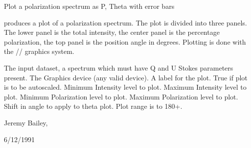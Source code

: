 \begin{manroutinedescription}
        Plot a polarization spectrum as P, Theta with error bars

        {} produces a plot of a polarization spectrum. The plot is
        divided into three panels. The lower panel is the total intensity,
        the center panel is the percentage polarization, the top panel
        is the position angle in degrees.
        Plotting is done with the {}/{}/{} %
graphics system.

\begin{manparametertable}
  The input %
dataset, a spectrum which must
                               have Q and U Stokes parameters present.
   The Graphics device (any %
valid {} device).
     A label for the plot.
  True if plot is to be autoscaled.
     Minimum Intensity level to plot.
     Maximum Intensity level to plot.
     Minimum Polarization level to %
plot.
     Maximum Polarization level to %
plot.
     Shift in angle to apply to %
theta plot.
                               Plot range is {} to 180+{}.

\end{manparametertable}
         Jeremy Bailey, {}

         6/12/1991

\end{manroutinedescription}
